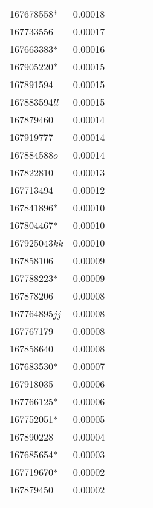 \begin{landscape}
\begin{longtable}{p{1.6cm}p{1.2cm}p{1.5cm}p{1.5cm}p{2.8cm}p{13.5cm}}
167678558*&0.00018&&&& \\
167733556&0.00017&&&& \\
167663383*&0.00016&&&& \\
167905220*&0.00015&&&& \\
167891594&0.00015&&&& \\
167883594$ll$&0.00015&&&& \\
167879460&0.00014&&&& \\
167919777&0.00014&&&& \\
167884588$o$&0.00014&&&& \\
167822810&0.00013&&&& \\
167713494&0.00012&&&& \\
167841896*&0.00010&&&& \\
167804467*&0.00010&&&& \\
167925043$kk$&0.00010&&&& \\
167858106&0.00009&&&& \\
167788223*&0.00009&&&& \\
167878206&0.00008&&&& \\
167764895$jj$&0.00008&&&& \\
167767179&0.00008&&&& \\
167858640&0.00008&&&& \\
167683530*&0.00007&&&& \\
167918035&0.00006&&&& \\
167766125*&0.00006&&&& \\
167752051*&0.00005&&&& \\
167890228&0.00004&&&& \\
167685654*&0.00003&&&& \\
167719670*&0.00002&&&& \\
167879450&0.00002&&&& \\
&&&&& \\
\end{longtable}
\endgroup
\end{landscape}
